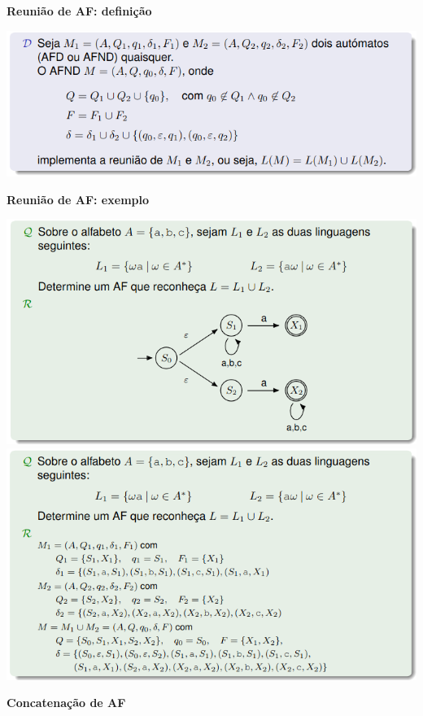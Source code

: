 \documentclass{article}
\begin{document}
\begin{flushleft}
  \textbf{Reunião de AF: definição}

  \begin{center}
    \includegraphics[scale=0.4]{60}
  \end{center}

  \textbf{Reunião de AF: exemplo}

  \begin{center}
    \includegraphics[scale=0.4]{61}
    \includegraphics[scale=0.4]{62}
  \end{center}
  \vspace{5mm}

  \textbf{Concatenação de AF}


\end{flushleft}
\end{document}
